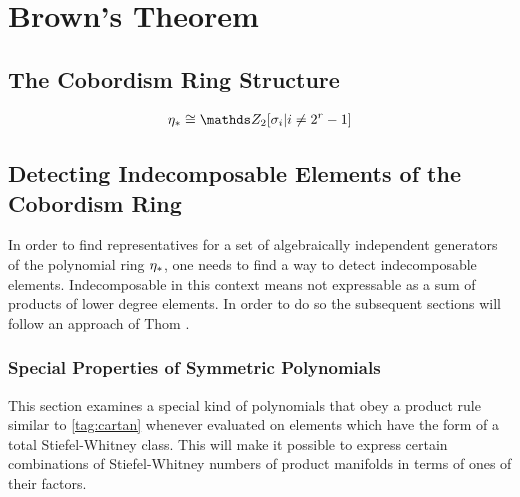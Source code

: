 % 

\chapter{Brown's Theorem}

\section{The Cobordism Ring Structure}

\begin{LemDef} %
\end{LemDef}

\begin{Thm} %
  \begin{gather*}
    \c_* \cong \Zmod2[\sigma_i| i\neq 2^r-1]
  \end{gather*}
\end{Thm}


\section{Detecting Indecomposable Elements of the Cobordism Ring}
In order to find representatives for a set of algebraically
independent generators of the polynomial ring $\eta_*$, one needs to
find a way to detect indecomposable elements. Indecomposable in this
context means not expressable as a sum of products of lower degree
elements.
In order to do so the subsequent sections will follow an approach of
Thom 
\cite[Chapters~IV.5 and~IV.6]{thom}.


\subsection{Special Properties of Symmetric Polynomials}
This section examines a special kind of polynomials that
obey a product rule similar to \ref{tag:cartan} whenever evaluated on
elements which have the form of a total Stiefel-Whitney class.
This will make it possible to express certain combinations of
Stiefel-Whitney numbers of product manifolds in terms of ones of their
factors.

